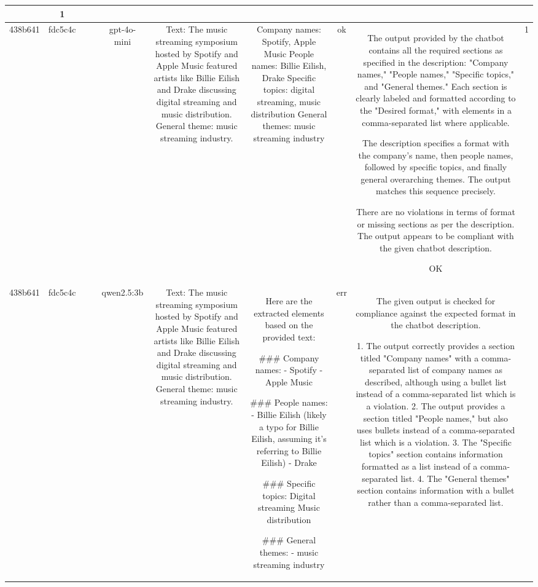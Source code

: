 \begin{table}[h!]
\begin{tabular}{|c|c|c|c|c|c|c|c|c|c|}
{ERR & 1\\
\hline
438b641 & fdc5c4c &  &  & gpt-4o-mini & Text: The music streaming symposium hosted by Spotify and Apple Music featured artists like Billie Eilish and Drake discussing digital streaming and music distribution. General theme: music streaming industry. & Company names: Spotify, Apple Music  
People names: Billie Eilish, Drake  
Specific topics: digital streaming, music distribution  
General themes: music streaming industry & ok & The output provided by the chatbot contains all the required sections as specified in the description: "Company names," "People names," "Specific topics," and "General themes." Each section is clearly labeled and formatted according to the "Desired format," with elements in a comma-separated list where applicable.

The description specifies a format with the company's name, then people names, followed by specific topics, and finally general overarching themes. The output matches this sequence precisely.

There are no violations in terms of format or missing sections as per the description. The output appears to be compliant with the given chatbot description.

OK & 1\\
\hline
438b641 & fdc5c4c &  &  & qwen2.5:3b & Text: The music streaming symposium hosted by Spotify and Apple Music featured artists like Billie Eilish and Drake discussing digital streaming and music distribution. General theme: music streaming industry. & Here are the extracted elements based on the provided text:

### Company names:
- Spotify
- Apple Music

### People names:
- Billie Eilish (likely a typo for Billie Eilish, assuming it’s referring to Billie Eilish)
- Drake

### Specific topics:
Digital streaming  
Music distribution

### General themes:
- music streaming industry & err & The given output is checked for compliance against the expected format in the chatbot description. 

1. The output correctly provides a section titled "Company names" with a comma-separated list of company names as described, although using a bullet list instead of a comma-separated list which is a violation. 
2. The output provides a section titled "People names," but also uses bullets instead of a comma-separated list which is a violation.
3. The "Specific topics" section contains information formatted as a list instead of a comma-separated list.
4. The "General themes" section contains information with a bullet rather than a comma-separated list.

}
\end{tabular}
\end{table}
